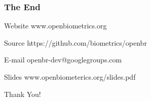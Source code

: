 \documentclass[12pt]{beamer}
\begin{document}
\begin{frame}
\frametitle{The End}
\begin{block}{Website}
\centering
www.openbiometrics.org
\end{block}
\begin{block}{Source}
\centering
https://github.com/biometrics/openbr
\end{block}
\begin{block}{E-mail}
\centering
openbr-dev@googlegroups.com
\end{block}
\begin{block}{Slides}
\centering
www.openbiometerics.org/slides.pdf
\end{block}
\begin{center}
Thank You!
\end{center}
\end{frame}


\end{document}
